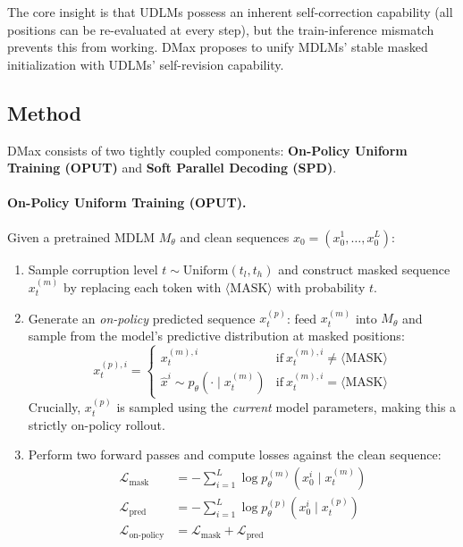 \documentclass[11pt]{article}
\begin{document}
The core insight is that UDLMs possess an inherent self-correction capability (all positions can be re-evaluated at every step), but the train-inference mismatch prevents this from working. DMax proposes to unify MDLMs' stable masked initialization with UDLMs' self-revision capability.

\subsection{Method}

DMax consists of two tightly coupled components: \textbf{On-Policy Uniform Training (OPUT)} and \textbf{Soft Parallel Decoding (SPD)}.

\paragraph{On-Policy Uniform Training (OPUT).}
Given a pretrained MDLM $M_\theta$ and clean sequences $x_0 = (x_{0}^{1}, \ldots, x_{0}^{L})$:

\begin{enumerate}
    \item Sample corruption level $t \sim \mathrm{Uniform}(t_l, t_h)$ and construct masked sequence $x_{t}^{(m)}$ by replacing each token with $\langle\mathrm{MASK}\rangle$ with probability $t$.

    \item Generate an \textit{on-policy} predicted sequence $x_{t}^{(p)}$: feed $x_{t}^{(m)}$ into $M_\theta$ and sample from the model's predictive distribution at masked positions:
    \begin{equation}
        x_{t}^{(p),i} = \begin{cases} x_{t}^{(m),i} & \mathrm{if}\ x_{t}^{(m),i} \neq \langle\mathrm{MASK}\rangle \\ \hat{x}^{i} \sim p_\theta(\cdot \mid x_{t}^{(m)}) & \mathrm{if}\ x_{t}^{(m),i} = \langle\mathrm{MASK}\rangle \end{cases}
    \end{equation}
    Crucially, $x_{t}^{(p)}$ is sampled using the \textit{current} model parameters, making this a strictly on-policy rollout.

    \item Perform two forward passes and compute losses against the clean sequence:
    \begin{align}
        \mathcal{L}_{\mathrm{mask}} &= -\sum_{i=1}^{L} \log p_\theta^{(m)}(x_{0}^{i} \mid x_{t}^{(m)}) \\
        \mathcal{L}_{\mathrm{pred}} &= -\sum_{i=1}^{L} \log p_\theta^{(p)}(x_{0}^{i} \mid x_{t}^{(p)}) \\
        \mathcal{L}_{\mathrm{on\text{-}policy}} &= \mathcal{L}_{\mathrm{mask}} + \mathcal{L}_{\mathrm{pred}}
    \end{align}
\end{enumerate}
\end{document}
